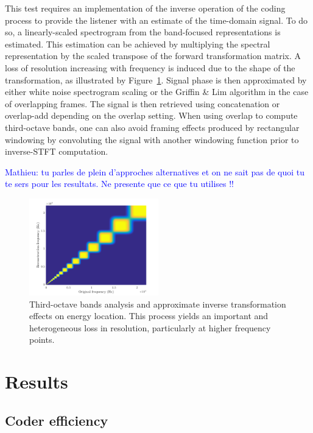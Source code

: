 \documentclass[sensors,article,submit,moreauthors,pdftex,10pt,a4paper]{mdpi}
\newcommand{\ml}[1]{\textcolor{blue}{ Mathieu: #1}}
\begin{document}
This test requires an implementation of the inverse operation of the coding process to provide the listener with an estimate of the time-domain signal. To do so, a linearly-scaled spectrogram from the band-focused representations is estimated. This estimation can be achieved by multiplying the spectral representation by the scaled transpose of the forward transformation matrix. A loss of resolution increasing with frequency is induced due to the shape of the transformation, as illustrated by Figure~\ref{fig:freq}. Signal phase is then approximated by either white noise spectrogram scaling or the Griffin \& Lim algorithm \cite{griffin1984} in the case of overlapping frames. The signal is then retrieved using concatenation or overlap-add depending on the overlap setting. When using overlap to compute third-octave bands, one can also avoid framing effects produced by rectangular windowing by convoluting the signal with another windowing function prior to inverse-STFT computation.

\ml{tu parles de plein d'approches alternatives et on ne sait pas de quoi tu te sers pour les resultats. Ne presente que ce que tu utilises !!}

\begin{figure}[htbp]
	\centering
		\includegraphics[width=0.5\textwidth]{figures/freq.png}
	\caption{Third-octave bands analysis and approximate inverse transformation effects on energy location. This process yields an important and heterogeneous loss in resolution, particularly at higher frequency points.}
	\label{fig:freq}
\end{figure}



\section{Results} \label{sec:results}

\subsection{Coder efficiency}
\end{document}

